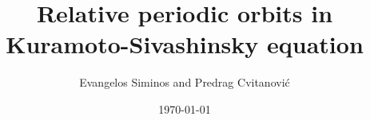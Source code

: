 \documentclass[pre,preprint]{revtex4}
\begin{document}
                \title{
Relative periodic orbits in Kuramoto-Sivashinsky equation
                 }
                  \author{
Evangelos Siminos
	and
Predrag Cvitanovi\'c
                          }
  
                  \date{\today} %
  
% 
                     \maketitle

% 


% 
        \begin{acknowledgments}

        \end{acknowledgments}

        \Preliminary{


            } %


\end{document}
